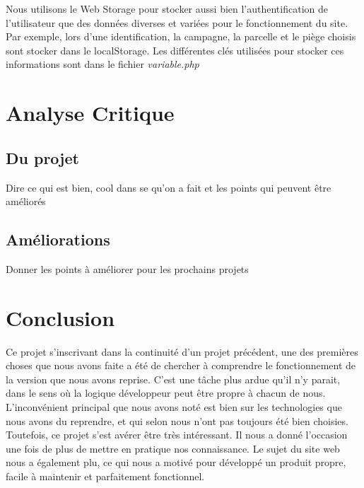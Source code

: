 \documentclass[twoside]{EPURapport}
\begin{document}
		Nous utilisons le Web Storage pour stocker aussi bien l'authentification de l'utilisateur que des données diverses et variées pour le fonctionnement du site. Par exemple, lors d'une identification, la campagne, la parcelle et le piège choisis sont stocker dans le localStorage. Les différentes clés utilisées pour stocker ces informations sont dans le fichier \emph{variable.php}

\chapter{Analyse Critique}

	\section{Du projet}
	
	Dire ce qui est bien, cool dans se qu'on a fait et les points qui peuvent être améliorés
	
	\section{Améliorations}
	
	Donner les points à améliorer pour les prochains projets

\chapter{Conclusion}

Ce projet s'inscrivant dans la continuité d'un projet précédent, une des premières choses que nous avons faite a été de chercher à comprendre le fonctionnement de la version que nous avons reprise. C'est une tâche plus ardue qu'il n'y parait, dans le sens où la logique développeur peut être propre à chacun de nous. L'inconvénient principal que nous avons noté est bien sur les technologies que nous avons du reprendre, et qui selon nous n'ont pas toujours été bien choisies.\\

Toutefois, ce projet s'est avérer être très intéressant. Il nous a donné l'occasion une fois de plus de mettre en pratique nos connaissance. Le sujet du site web nous a également plu, ce qui nous a motivé pour développé un produit propre, facile à maintenir et parfaitement fonctionnel.

\annexes
\end{document}
